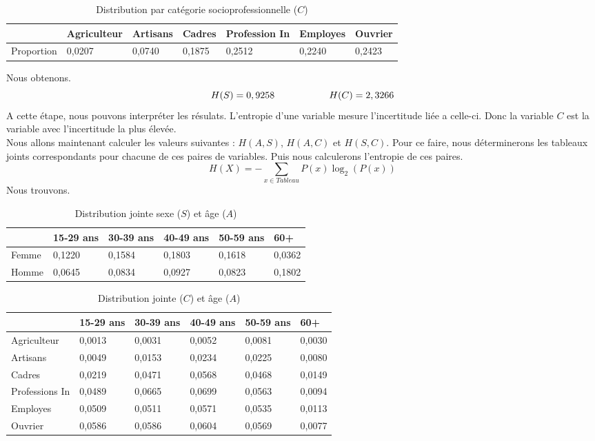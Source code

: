 \documentclass{article}
\begin{document}
\begin{table}[H]
  \centering
  \caption{Distribution par catégorie socioprofessionnelle ($C$)}
  \begin{tabular}{|l|l|l|l|l|l|l|}
  \hline
             & Agriculteur & Artisans & Cadres & Profession In & Employes & Ouvrier \\ \hline
  Proportion & 0,0207      & 0,0740   & 0,1875 & 0,2512        & 0,2240   & 0,2423  \\ \hline
  \end{tabular}
  \end{table}


Nous obtenons.
\[
H(S) = 0,9258  \hspace{2 cm} H(C)= 2,3266
\]
A cette étape, nous pouvons interpréter les résulats. L'entropie d'une variable mesure l'incertitude liée a celle-ci. Donc la variable $C$ est la variable avec l'incertitude la plus élevée.\\
Nous allons maintenant calculer les valeurs suivantes : $H(A,S)$, $H(A,C)$ et $H(S,C)$. Pour ce faire, nous déterminerons les tableaux joints correspondants pour chacune de ces paires de variables. Puis nous calculerons l'entropie de ces paires.
\[
  H(X) = - \sum_{x \in Tableau} P(x) \log_2(P(x))
\]
Nous trouvons.
\begin{table}[H]
  \centering
  \caption{Distribution jointe sexe ($S$) et âge ($A$)}
  \begin{tabular}{|l|l|l|l|l|l|}
  \hline
        & 15-29 ans & 30-39 ans & 40-49 ans & 50-59 ans & 60+    \\ \hline
  Femme & 0,1220    & 0,1584    & 0,1803    & 0,1618    & 0,0362 \\ \hline
  Homme & 0,0645    & 0,0834    & 0,0927    & 0,0823    & 0,1802 \\ \hline
  \end{tabular}
\end{table}

  \begin{table}[H]
    \centering
    \caption{Distribution jointe ($C$) et âge ($A$)}
    \begin{tabular}{|l|l|l|l|l|l|}
    \hline
                   & 15-29 ans & 30-39 ans & 40-49 ans & 50-59 ans & 60+    \\ \hline
    Agriculteur    & 0,0013    & 0,0031    & 0,0052    & 0,0081    & 0,0030 \\ \hline
    Artisans       & 0,0049    & 0,0153    & 0,0234    & 0,0225    & 0,0080 \\ \hline
    Cadres         & 0,0219    & 0,0471    & 0,0568    & 0,0468    & 0,0149 \\ \hline
    Professions In & 0,0489    & 0,0665    & 0,0699    & 0,0563    & 0,0094 \\ \hline
    Employes       & 0,0509    & 0,0511    & 0,0571    & 0,0535    & 0,0113 \\ \hline
    Ouvrier        & 0,0586    & 0,0586    & 0,0604    & 0,0569    & 0,0077 \\ \hline
    \end{tabular}
  \end{table}
\end{document}
